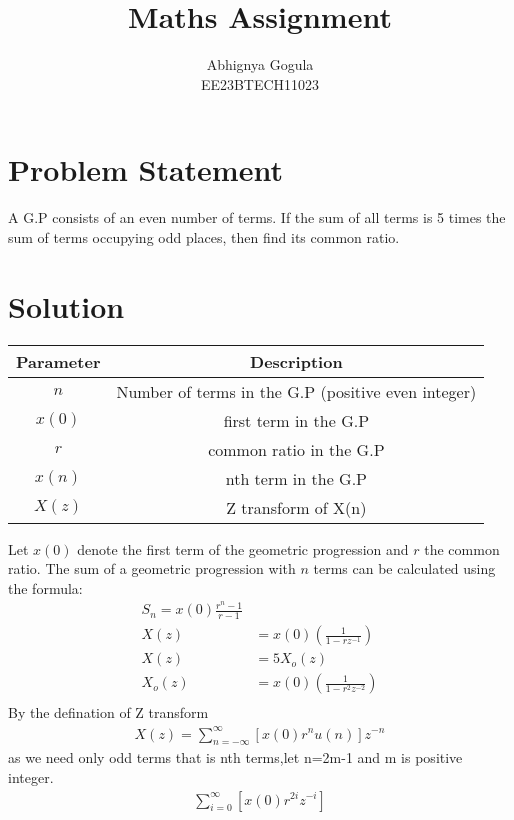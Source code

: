 \documentclass{article}
\begin{document}
\title{Maths Assignment}
\author{Abhignya Gogula\\
        EE23BTECH11023}
\maketitle
\section*{Problem Statement}
A G.P consists of an even number of terms. If the sum of all terms is 5 times the sum of terms occupying odd places, then find its common ratio.
\section*{Solution}
\begin{table}[h!]
\centering
\begin{tabular}{|c|c|}
\hline
Parameter & Description \\
\hline
\( n \) & Number of terms in the G.P (positive even integer) \\
\hline
\(x(0) \) & first term in the G.P \\
\hline
\( r \) & common ratio in the G.P \\
\hline
\( x(n) \) & nth term in the G.P \\
\hline
\( X(z) \) & Z transform of X(n) \\
\hline
\end{tabular}
\end{table}
Let \( x(0) \) denote the first term of the geometric progression and \( r \) the common ratio. The sum of a geometric progression with \( n \) terms can be calculated using the formula:
\begin{align}
 S_n = x(0) \frac{{r^n - 1}}{{r - 1}} \\
X(z) &= x(0)\left(\frac{1}{1 - rz^{-1}}\right) \\
X(z) &= 5 X_o(z) \\
X_o(z) &= x(0)\left(\frac{1}{1 - r^2z^{-2}}\right) \\
\end{align}
By the defination of Z transform 
\begin{align}
X(z)= \sum_{n=-\infty}^{\infty} [x(0)r^{n}u(n)]z^{-n}
\end{align}
as we need only odd terms that is nth terms,let n=2m-1 and m is positive integer.
\begin{align}
\sum_{i=0}^{\infty} [x(0)r^{2i}z^{-i}]
\end{align}
\end{document}
